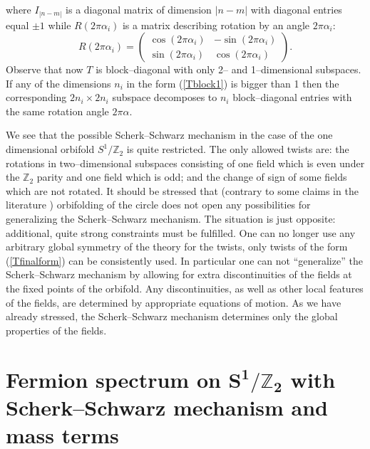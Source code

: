 \documentclass[a4paper,12pt]{article}
\def\ZZ{\mathbb Z}
\begin{document}
where $I_{|n-m|}$ is a diagonal matrix of dimension $|n-m|$ 
with diagonal entries equal $\pm1$ while
$R(2\pi\alpha_i)$ is a matrix describing rotation by
an angle $2\pi\alpha_i$: 
\begin{equation}
R(2\pi\alpha_i)=
\left(
\begin{array}{rr}
\cos(2\pi\alpha_i) & -\sin(2\pi\alpha_i)
\\[6pt]
\sin(2\pi\alpha_i) & \cos(2\pi\alpha_i) 
\end{array}
\right)
.
\end{equation}
Observe that now $T$ is block--diagonal with only 2-- and
1--dimensional subspaces. If any of the dimensions $n_i$ in the form
(\ref{Tblock1}) is bigger than 1 then the corresponding
$2n_i\times2n_i$ subspace decomposes to $n_i$ 
block--diagonal entries with the same rotation angle $2\pi\alpha$.

We see that the possible Scherk--Schwarz mechanism in the
case of the one dimensional orbifold $S^1/\ZZ_2$ is quite restricted. 
The only allowed twists are: the rotations in two--dimensional
subspaces consisting of one field which is even under the $\ZZ_2$
parity and one field which is odd; and the change of sign of some
fields which are not rotated. It should be stressed that
(contrary to some claims in the literature \cite{Bagger:2001qi})
orbifolding of the circle does not open any possibilities for
generalizing the Scherk--Schwarz mechanism. The situation is just
opposite: additional, quite strong constraints must be fulfilled. One
can no longer use any arbitrary global symmetry of the theory for the
twists, only  twists of the form (\ref{Tfinalform}) can be
consistently used. 
In particular one can not ``generalize'' the Scherk--Schwarz mechanism
by allowing for extra discontinuities of the fields at the fixed
points of the orbifold. Any discontinuities, as well as other local
features of the fields, are determined by appropriate equations of
motion. As we have already stressed, the Scherk--Schwarz mechanism
determines only the global properties of the fields.



\section{Fermion spectrum on $\boldsymbol{S^1/\ZZ_2}$ with
Scherk--Schwarz mechanism and mass terms} 
\end{document}
